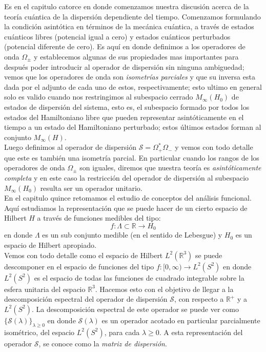 \documentclass[12pt]{book}
\numberwithin{equation}{chapter}
\def\R{\mathbb{R}}
\def\S{\mathcal{S}}
\def\rar{\rightarrow}
\def\O{\Omega}
\begin{document}
Es en el capitulo catorce en donde comenzamos nuestra discusi\'on acerca de la teor\'ia cu\'antica de la dispersi\'on dependiente del tiempo. Comenzamos formulando la condici\'on asint\'otica en t\'erminos de la mec\'anica cu\'antica, a trav\'es de estados cu\'anticos libres (potencial igual a cero) y estados cu\'anticos perturbados (potencial diferente de cero). Es aqu\'i en donde definimos a los operadores de onda $\O_{\pm}$ y establecemos algunas de sus propiedades mas importantes para despu\'es poder introducir al operador de dispersi\'on sin ninguna ambiguedad; vemos que los operadores de onda son \emph{isometr\'ias parciales} y que su inversa esta dada por el adjunto de cada uno de estos, respectivamente; esto ultimo en general solo es valido cuando nos restringimos al subespacio cerrado $M_{\infty}(H_{0})$ de estados de dispersi\'on del sistema, esto es, el subespacio formado por todos los estados del Hamiltoniano libre que pueden representar asint\'oticamente en el tiempo a un estado del Hamiltoniano perturbado; estos \'ultimos estados forman al conjunto $M_{\infty}(H)$.\\
Luego definimos al operador de dispersi\'on $\S = \O_{+}^{*} \O_{-}$ y vemos con todo detalle que este es tambi\'en una isometr\'ia parcial. En particular cuando los rangos de los operadores de onda $\O_{\pm}$ son iguales, diremos que nuestra teor\'ia es \emph{asint\'oticamente completa} y en este caso la restricci\'on del operador de dispersi\'on al subespacio $M_{\infty}(H_{0})$ resulta ser un operador unitario.\\

En el capitulo quince retomamos el estudio de conceptos del an\'alisis funcional. Aqu\'i estudiamos la representaci\'on que se puede hacer de un cierto espacio de Hilbert $H$ a trav\'es de funciones medibles del tipo:
$$ f: \Lambda\subset \R \rar H_{0} $$
en donde $\Lambda$ es un sub conjunto medible (en el sentido de Lebesgue) y $H_{0}$ es un espacio de Hilbert apropiado.\\
Vemos con todo detalle como el espacio de Hilbert $L^{2}(\R^{3})$ se puede descomponer en el espacio de funciones del tipo $ f:[0,\infty) \rar L^{2}(S^{2}) $ en donde $L^{2}(S^{2})$ es el espacio de todas las funciones de cuadrado integrable sobre la esfera unitaria del espacio $\R^{3}$. Hacemos esto con el objetivo de llegar a la descomposici\'on espectral del operador de dispersi\'on $\S$, con respecto a $\R^{+}$ y a $L^{2}(S^{2})$. La descomposici\'on espectral de este operador se puede ver como $ \{ \S(\lambda) \}_{\lambda \geq 0} $ en donde $\S(\lambda)$ es un operador acotado en particular parcialmente isom\'etrico, del espacio $L^{2}(S^{2})$, para cada $ \lambda \geq 0 $. A esta representaci\'on del operador $\S$, se conoce como la \emph{matriz de dispersi\'on}.\\
\end{document}
